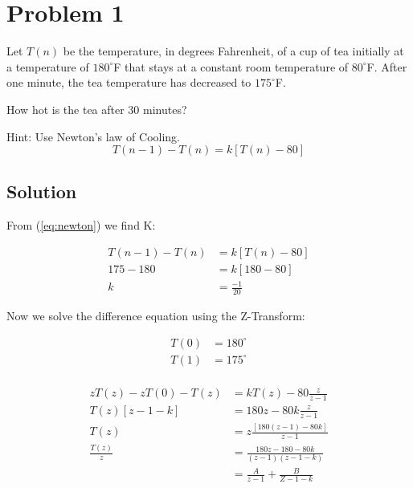 \section*{Problem 1}

Let $T(n)$ be the temperature, in degrees Fahrenheit, of a cup of tea initially at a 
temperature of $180^\circ$F that stays at a constant room temperature of $80^\circ$F.
After one minute, the tea temperature has decreased to $175^\circ$F.

How hot is the tea after 30 minutes?

Hint: Use Newton's law of Cooling.
\begin{equation}
T(n-1) - T(n) = k[T(n) - 80]
\label{eq:newton}
\end{equation} 

\subsection*{Solution}

From (\ref{eq:newton}) we find K:

\begin{equation*}
\begin{aligned}
T(n-1) - T(n) &= k[T(n) - 80]\\
175 - 180 &= k[180 - 80]\\
k&= \frac{-1}{20}
\end{aligned}
\end{equation*} 

Now we solve the difference equation using the Z-Transform:

\begin{equation*}
\begin{aligned}
T(0) &= 180^\circ \\
T(1) &= 175^\circ \\
\end{aligned}
\end{equation*} 

\begin{equation*}
\begin{aligned}
zT(z) - zT(0) - T(z) &= k T(z) - 80\frac{z}{z-1} \\
T(z)[z -1 -k] &= 180z - 80k \frac{z}{z-1}\\
T(z) &= z \frac{[180(z-1) - 80k]}{z-1}\\
\frac{T(z)}{z} &= \frac{180z - 180 - 80k}{(z-1)(z-1-k)}\\
&= \frac{A}{z-1} + \frac{B}{Z-1-k}
\end{aligned}
\end{equation*} 

